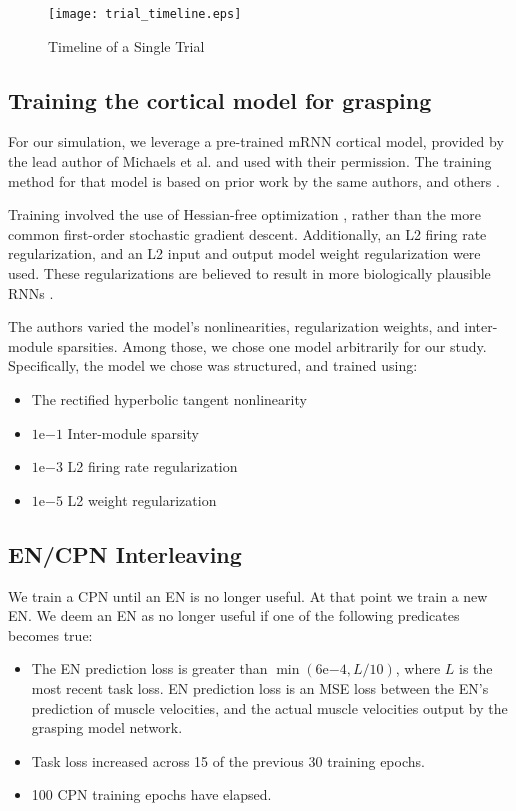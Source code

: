 \documentclass[12pt]{iopart}
\begin{document}
\begin{figure}[h!]
\centering
\texttt{[image: trial\_timeline.eps]}
\caption{Timeline of a Single Trial}
\label{fig:trial_timeline}
\end{figure}

\subsection{Training the cortical model for grasping}
\label{sup:michaelstraining}

For our simulation, we leverage a pre-trained mRNN cortical model, provided by the
lead author of Michaels et al. \cite{michaels.mrnn} and used with their permission.
The training method for that model is based on prior work by the same authors, and
others \cite{sussillo.mrnn}.

Training involved the use of Hessian-free optimization \cite{martens.hessianfree},
rather than the more common first-order stochastic gradient descent. Additionally, an L2 firing
rate regularization, and an L2 input and output model weight regularization were used.
These regularizations are believed to result in more biologically plausible RNNs \cite{kao.sim}.

The authors varied the model's nonlinearities, regularization weights, and
inter-module sparsities. Among those, we chose one model arbitrarily for our study. Specifically,
the model we chose was structured, and trained using:

\begin{itemize}
    \item The rectified hyperbolic tangent nonlinearity
    \item $1\mathrm{e}{-1}$ Inter-module sparsity
    \item $1\mathrm{e}{-3}$ L2 firing rate regularization
    \item $1\mathrm{e}{-5}$ L2 weight regularization
\end{itemize}

\subsection{EN/CPN Interleaving}
\label{sup:encpninter}
We train a CPN until an EN is no longer useful. At that point we train a new EN. We deem an EN
as no longer useful if one of the following predicates becomes true:

\begin{itemize}
	\item The EN prediction loss is greater than $\min(6\mathrm{e}{-4}, L/10)$, where $L$ is the most recent
	      task loss. EN prediction loss is an MSE loss between the EN's prediction of muscle
	      velocities, and the actual muscle velocities output by the grasping model network.
	\item Task loss increased across 15 of the previous 30 training epochs.
	\item 100 CPN training epochs have elapsed.
\end{itemize}
\end{document}
